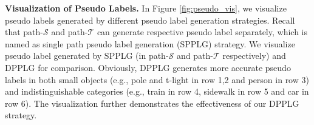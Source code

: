 \documentclass[10pt,twocolumn,letterpaper]{article}
\begin{document}
{\noindent \textbf{Visualization of Pseudo Labels.}}\hspace{3pt}
In Figure \ref{fig:pseudo_vis}, we visualize pseudo labels generated by different pseudo label generation strategies. Recall that path-$\mathcal{S}$ and path-$\mathcal{T}$ can generate respective pseudo label separately, which is named as single path pseudo label generation (SPPLG) strategy. We visualize pseudo label generated by SPPLG (in path-$\mathcal{S}$ and path-$\mathcal{T}$ respectively) and DPPLG for comparison. Obviously, DPPLG generates more accurate pseudo labels in both small objects (e.g., pole and t-light in row 1,2 and person in row 3) and indistinguishable categories (e.g., train in row 4, sidewalk in row 5 and car in row 6). The visualization further demonstrates the effectiveness of our DPPLG strategy. 
\end{document}
